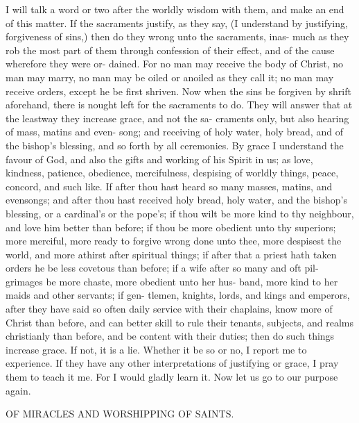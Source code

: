 \documentclass{custom}
\begin{document}
I will talk a word or two after the worldly wisdom with 
them, and make an end of this matter. If the sacraments 
justify, as they say, (I understand by justifying, forgiveness 
of sins,) then do they wrong unto the sacraments, inas- 
much as they rob the most part of them through confession 
of their effect, and of the cause wherefore they were or- 
dained. For no man may receive the body of Christ, no 
man may marry, no man may be oiled or anoiled as they call 
it; no man may receive orders, except he be first shriven. 
Now when the sins be forgiven by shrift aforehand, there 
is nought left for the sacraments to do. They will answer 
that at the leastway they increase grace, and not the sa- 
craments only, but also hearing of mass, matins and even- 
song; and receiving of holy water, holy bread, and of the 
bishop's blessing, and so forth by all ceremonies. By 
grace I understand the favour of God, and also the gifts 
and working of his Spirit in us; as love, kindness, 
patience, obedience, mercifulness, despising of worldly 
things, peace, concord, and such like. If after thou hast 
heard so many masses, matins, and evensongs; and after 
thou hast received holy bread, holy water, and the bishop's 
blessing, or a cardinal's or the pope's; if thou wilt be 
more kind to thy neighbour, and love him better than 
before; if thou be more obedient unto thy superiors; more 
merciful, more ready to forgive wrong done unto thee, 
more despisest the world, and more athirst after spiritual 
things; if after that a priest hath taken orders he be less 
covetous than before; if a wife after so many and oft pil- 
grimages be more chaste, more obedient unto her hus- 
band, more kind to her maids and other servants; if gen- 
tlemen, knights, lords, and kings and emperors, after they 
have said so often daily service with their chaplains, know 
more of Christ than before, and can better skill to rule their 
tenants, subjects, and realms christianly than before, and 
be content with their duties; then do such things increase 
grace. If not, it is a lie. Whether it be so or no, I report 
me to experience. If they have any other interpretations 
of justifying or grace, I pray them to teach it me. For I 
would gladly learn it. Now let us go to our purpose 
again. 


OF MIRACLES AND WORSHIPPING OF SAINTS. 
\end{document}

